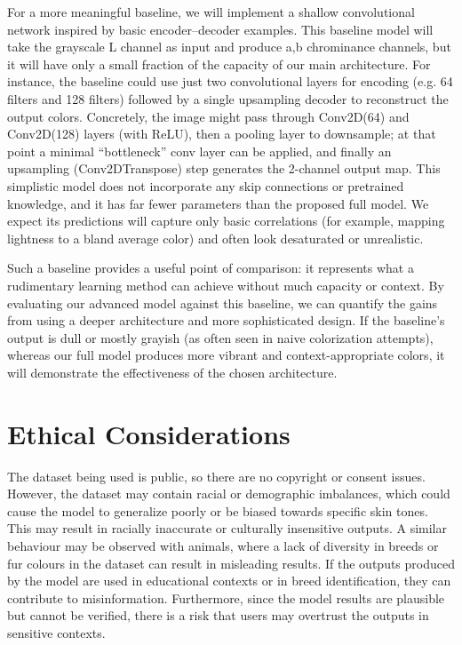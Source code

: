 \documentclass{article} %
\begin{document}
For a more meaningful baseline, we will implement a shallow convolutional network inspired by basic encoder–decoder examples. \cite{leatvanich2025image} This baseline model will take the grayscale L channel as input and produce a,b chrominance channels, but it will have only a small fraction of the capacity of our main architecture. For instance, the baseline could use just two convolutional layers for encoding (e.g. 64 filters and 128 filters) followed by a single upsampling decoder to reconstruct the output colors. Concretely, the image might pass through Conv2D(64) and Conv2D(128) layers (with ReLU), then a pooling layer to downsample; at that point a minimal “bottleneck” conv layer can be applied, and finally an upsampling (Conv2DTranspose) step generates the 2-channel output map. \cite{leatvanich2025image} This simplistic model does not incorporate any skip connections or pretrained knowledge, and it has far fewer parameters than the proposed full model. We expect its predictions will capture only basic correlations (for example, mapping lightness to a bland average color) and often look desaturated or unrealistic. \cite{rosebrock2019bwcolorization}

Such a baseline provides a useful point of comparison: it represents what a rudimentary learning method can achieve without much capacity or context. By evaluating our advanced model against this baseline, we can quantify the gains from using a deeper architecture and more sophisticated design. If the baseline’s output is dull or mostly grayish (as often seen in naive colorization attempts), whereas our full model produces more vibrant and context-appropriate colors, it will demonstrate the effectiveness of the chosen architecture. \cite{rosebrock2019bwcolorization}

\section{Ethical Considerations}
\label{ethical}

The dataset being used is public, so there are no copyright or consent issues. However, the dataset may contain racial or demographic imbalances, which could cause the model 
to generalize poorly or be biased towards specific skin tones. This may result in racially inaccurate or culturally insensitive outputs. A similar behaviour may be observed with 
animals, where a lack of diversity in breeds or fur colours in the dataset can result in misleading results. If the outputs produced by the model are used in educational contexts 
or in breed identification, they can contribute to misinformation. Furthermore, since the model results are plausible but cannot be verified, there is a risk that users may 
overtrust the outputs in sensitive contexts.
\end{document}
